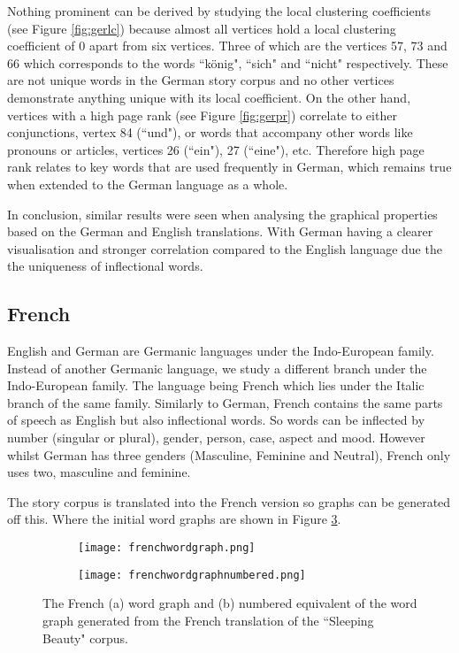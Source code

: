 Nothing prominent can be derived by studying the local clustering coefficients (see Figure \ref{fig:gerlc}) because almost all vertices hold a local clustering coefficient of 0 apart from six vertices. Three of which are the vertices 57, 73 and 66 which corresponds to the words ``könig", ``sich" and ``nicht" respectively. These are not unique words in the German story corpus and no other vertices demonstrate anything unique with its local coefficient. 
On the other hand, vertices with a high page rank (see Figure \ref{fig:gerpr}) correlate to either conjunctions, vertex 84 (``und"), or words that accompany other words like pronouns or articles, vertices 26 (``ein"), 27 (``eine"), etc. Therefore high page rank relates to key words that are used frequently in German, which remains true when extended to the German language as a whole.

In conclusion, similar results were seen when analysing the graphical properties based on the German and English translations. With German having a clearer visualisation and stronger correlation compared to the English language due the the uniqueness of inflectional words.

\subsection{French}
English and German are Germanic languages under the Indo-European family. Instead of another Germanic language, we study a different branch under the Indo-European family. The language being French which lies under the Italic branch of the same family. Similarly to German, French contains the same parts of speech as English but also inflectional words. So words can be inflected by number (singular or plural), gender, person, case, aspect and mood. However whilst German has three genders (Masculine, Feminine and Neutral), French \cite{hawkins2015french} only uses two, masculine and feminine. 

The story corpus is translated into the French version so graphs can be generated off this. Where the initial word graphs are shown in Figure \ref{fig:fregraph}. 

\begin{figure}[!htb]
\centering
\begin{subfigure}{.45\textwidth}
	\texttt{[image: frenchwordgraph.png]}
	\caption{}
	\label{fig:freword}
\end{subfigure}
\hfill
\begin{subfigure}{.45\textwidth}
	\texttt{[image: frenchwordgraphnumbered.png]}
	\caption{}
	\label{fig:frenum}
\end{subfigure}
\caption{The French (a) word graph and (b) numbered equivalent of the word graph generated from the French translation of the ``Sleeping Beauty" corpus.}
\label{fig:fregraph}
\end{figure}


